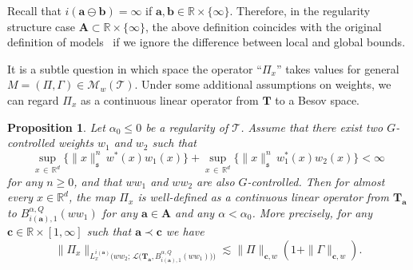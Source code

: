 \documentclass[10pt]{amsart}
\newtheorem{prop}[theo]{Proposition}
\theoremstyle{definition}
\numberwithin{equation}{section}
\newcommand{\bbR}{\mathbb{R}}
\newcommand{\mfs}{\mathfrak{s}}
\newcommand{\wco}{w^*}
\newcommand{\bfa}{\mathbf{a}}
\newcommand{\bfb}{\mathbf{b}}
\newcommand{\bfc}{\mathbf{c}}
\newcommand{\bfaob}{\mathbf{a}\ominus\mathbf{b}}
\newcommand{\bfA}{\mathbf{A}}
\newcommand{\bfT}{\mathbf{T}}
\newcommand{\mcL}{\mathcal{L}}
\newcommand{\scT}{\mathscr{T}}
\newcommand{\scM}{\mathscr{M}}
\begin{document}
Recall that $i(\bfaob)=\infty$ if $\bfa,\bfb\in\bbR\times\{\infty\}$. Therefore, in the regularity structure case $\bfA\subset\bbR\times\{\infty\}$, the above definition coincides with the original definition of models~\cite[Definition~2.17]{Hai14} if we ignore the difference between local and global bounds.


It is a subtle question in which space the operator ``$\Pi_x$'' takes values for general $M=(\Pi,\Gamma)\in\scM_w(\scT)$. Under some additional assumptions on weights, we can regard $\Pi_x$ as a continuous linear operator from $\bfT$ to a Besov space.

\begin{prop}\label{prop:whatisPixtau}
Let $\alpha_0\le0$ be a regularity of $\scT$. Assume that there exist two $G$-controlled weights $w_1$ and $w_2$ such that
\[
\sup_{x\,\in\,\bbR^d}\big\{\|x\|_\mfs^n\,\wco(x)w_1(x)\big\} +\sup_{x\,\in\,\bbR^d}\big\{\|x\|_\mfs^n\,\wco_1(x)w_2(x)\big\} <\infty
\]
for any $n\ge0$, and that $ww_1$ and $ww_2$ are also $G$-controlled. Then for almost every $x\in\bbR^d$, the map $\Pi_x$ is well-defined as a continuous linear operator from $\bfT_{\bfa}$ to $B_{i(\bfa),1}^{\alpha,Q}(ww_1)$ for any $\bfa\in\bfA$ and any $\alpha<\alpha_0$. More precisely, for any $\bfc\in\bbR\times[1,\infty]$ such that $\bfa\prec\bfc$ we have
\[
\|\Pi_x\|_{L_x^{i(\bfa)}\big(ww_2;\,\mcL\big(\bfT_\bfa,B_{i(\bfa),1}^{\alpha,Q}(ww_1)\big)\big)}
\lesssim\|\Pi\|_{\bfc,w}(1+\|\Gamma\|_{\bfc,w}).
\]
\end{prop}
\end{document}
